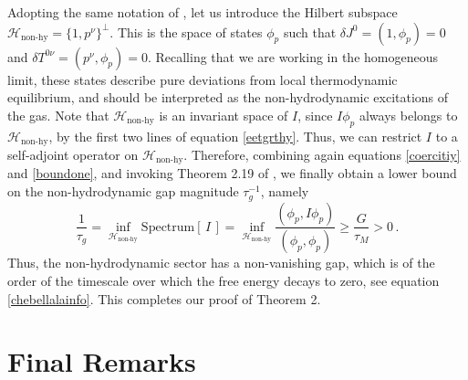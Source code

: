 \documentclass[a4paper, amsfonts, amssymb, amsmath, reprint, showkeys, nofootinbib, twoside, onecolumn,notitlepage]{revtex4-2}
\theoremstyle{definition}
\theoremstyle{theorem}
\theoremstyle{corollary}
\begin{document}
Adopting the same notation of \cite{GavassinoGapless2024rck}, let us introduce the Hilbert subspace $\mathcal{H}_{\text{non-hy}}=\{1,p^\nu \}^{\perp}$. This is the space of states $\phi_p$ such that $\delta J^0=(1,\phi_p)=0$ and $\delta T^{0\nu}=(p^\nu,\phi_p)=0$. Recalling that we are working in the homogeneous limit, these states describe pure deviations from local thermodynamic equilibrium, and should be interpreted as the non-hydrodynamic excitations of the gas. Note that $\mathcal{H}_{\text{non-hy}}$ is an invariant space of $I$, since $I\phi_p$ always belongs to $\mathcal{H}_{\text{non-hy}}$, by the first two lines of equation \eqref{eetgrthy}. Thus, we can restrict $I$ to a self-adjoint operator on $\mathcal{H}_{\text{non-hy}}$. Therefore, combining again equations \eqref{coercitiy} and \eqref{boundone}, and invoking Theorem 2.19 of \cite[Chapter 2, \S 2.4]{Teschlbook}, we finally obtain a lower bound on the non-hydrodynamic gap magnitude $\tau_g^{-1}$, namely
\begin{equation}
\dfrac{1}{\tau_g} = \inf_{\mathcal{H}_{\text{non-hy}}} \text{Spectrum}[\, I \, ] = \inf_{\mathcal{H}_{\text{non-hy}}} \dfrac{(\phi_p,I\phi_p)}{(\phi_p,\phi_p)} \geq \dfrac{G}{\tau_M} >0 \, .
\end{equation}
Thus, the non-hydrodynamic sector has a non-vanishing gap, which is of the order of the timescale over which the free energy decays to zero, see equation \eqref{chebellalainfo}. This completes our proof of Theorem 2.

\section{Final Remarks}
\end{document}

